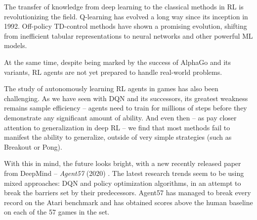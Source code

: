 The transfer of knowledge from deep learning to the classical methods in RL is revolutionizing the field.
Q-learning has evolved a long way since its inception in 1992.
Off-policy TD-control methods have shown a promising evolution, shifting from inefficient tabular representations to neural networks and other powerful ML models.

At the same time, despite being marked by the success of AlphaGo and its variants, RL agents are not yet prepared to handle real-world problems.

The study of autonomously learning RL agents in games has also been challenging.
As we have seen with DQN and its successors, its greatest weakness remains sample efficiency -- agents need to train for millions of steps before they demonstrate any significant amount of ability.
And even then -- as pay closer attention to generalization in deep RL -- we find that most methods fail to manifest the ability to generalize, outside of very simple strategies (such as Breakout or Pong).

With this in mind, the future looks bright, with a new recently released paper from DeepMind -- \emph{Agent57} (2020) \cite{agent57-paper}.
The latest research trends seem to be using mixed approaches: DQN and policy optimization algorithms, in an attempt to break the barriers set by their predecessors.
Agent57 has managed to break every record on the Atari benchmark and has obtained scores above the human baseline on each of the 57 games in the set.
